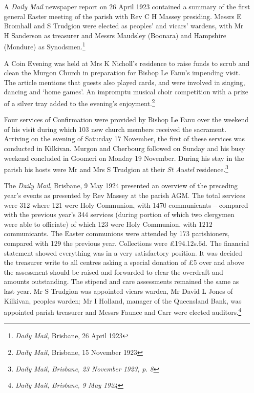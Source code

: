 A \emph{Daily Mail} newspaper report on 26 April 1923 contained a summary of the first general Easter meeting of the parish with Rev C H Massey presiding. Messrs E Bromhall and S Trudgion were elected as peoples' and vicars' wardens, with Mr H Sanderson as treasurer and Messrs Maudsley (Boonara) and Hampshire (Mondure) as Synodsmen.\footnote{\emph{Daily Mail,} Brisbane, 26 April 1923}


A Coin Evening was held at Mrs K Nicholl's residence to raise funds to scrub and clean the Murgon Church in preparation for Bishop Le Fanu's impending visit. The article mentions that guests also played cards, and were involved in singing, dancing and `home games'. An impromptu musical choir competition with a prize of a silver tray added to the evening's enjoyment.\footnote{\emph{Daily Mail,} Brisbane, 15 November 1923}


Four services of Confirmation were provided by Bishop Le Fanu over the weekend of his visit during which 103 new church members received the sacrament. Arriving on the evening of Saturday 17 November, the first of these services was conducted in Kilkivan. Murgon and Cherbourg followed on Sunday and his busy weekend concluded in Goomeri on Monday 19 November. During his stay in the parish his hosts were Mr and Mrs S Trudgion at their \emph{St Austel} residence.\footnote{\emph{Daily Mail, Brisbane, 23 November 1923, p. 8}}


The \emph{Daily Mail}, Brisbane, 9 May 1924 presented an overview of the preceding year's events as presented by Rev Massey at the parish AGM. The total services were 312 where 121 were Holy Communion, with 1470 communicants -- compared with the previous year's 344 services (during portion of which two clergymen were able to officiate) of which 123 were Holy Communion, with 1212 communicants. The Easter communions were attended by 173 parishioners, compared with 129 the previous year. Collections were \pounds194.12s.6d. The financial statement showed everything was in a very satisfactory position. It was decided the treasurer write to all centres asking a special donation of \pounds5 over and above the assessment should be raised and forwarded to clear the overdraft and amounts outstanding. The stipend and care assessments remained the same as last year. Mr S Trudgion was appointed vicars warden, Mr David L Jones of Kilkivan, peoples warden; Mr I Holland, manager of the Queensland Bank, was appointed parish treasurer and Messrs Faunce and Carr were elected auditors.\footnote{\emph{Daily Mail, Brisbane, 9 May 1924}}


